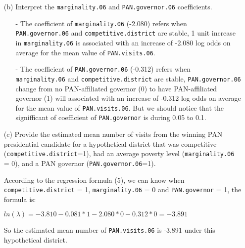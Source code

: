 \documentclass[12pt]{article} %
\begin{document}
\begin{enumerate}
\newpage
	\item [(b)]
	Interpret the \texttt{marginality.06} and \texttt{PAN.governor.06} coefficients.
\begin{itemize}
	\item[-] The coefficient of \texttt{marginality.06} (-2.080) refers when \texttt{PAN.governor.06} and \texttt{competitive.district} are stable, 1 unit increase in \texttt{marginality.06} is associated with an increase of -2.080 log odds on average for the mean value of \texttt{PAN.visits.06}.
	\item[-] The coefficient of \texttt{PAN.governor.06} (-0.312) refers when \texttt{marginality.06} and \texttt{competitive.district} are stable, \texttt{PAN.governor.06} change from no PAN-affiliated governor (0) to have PAN-affiliated governor (1) will associated with an increase of -0.312 log odds on average for the mean value of \texttt{PAN.visits.06}. But we should notice that the signifficant of coefficient of \texttt{PAN.governor} is during 0.05 to 0.1.
\end{itemize}

	\item [(c)]
	Provide the estimated mean number of visits from the winning PAN presidential candidate for a hypothetical district that was competitive (\texttt{competitive.district}=1), had an average poverty level (\texttt{marginality.06} = 0), and a PAN governor (\texttt{PAN.governor.06}=1).
	
\noindent According to the regression formula (5), we can know when \texttt{competitive.district} = 1, \texttt{marginality.06} = 0 and \texttt{PAN.governor} = 1, the formula is:
\par
$ln(\lambda) = -3.810 - 0.081 * 1 - 2.080 * 0 - 0.312 * 0 = -3.891$
\par
So the estimated mean number of \texttt{PAN.visits.06} is -3.891 under this hypothetical district.
\end{enumerate}
\end{document}
